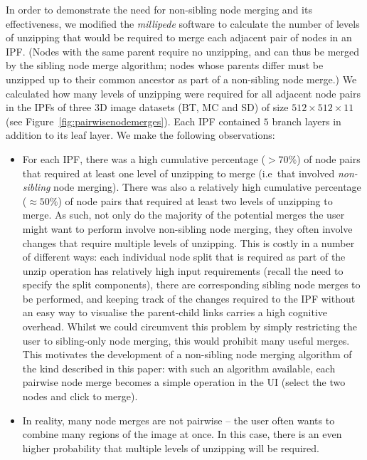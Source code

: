 \documentclass[10pt,twocolumn,twoside]{IEEEtran}
\begin{document}
In order to demonstrate the need for non-sibling node merging and its effectiveness, we modified the \emph{millipede} software to calculate the number of levels of unzipping that would be required to merge each adjacent pair of nodes in an IPF. (Nodes with the same parent require no unzipping, and can thus be merged by the sibling node merge algorithm; nodes whose parents differ must be unzipped up to their common ancestor as part of a non-sibling node merge.) We calculated how many levels of unzipping were required for all adjacent node pairs in the IPFs of three 3D image datasets (BT, MC and SD) of size $512 \times 512 \times 11$ (see Figure~\ref{fig:pairwisenodemerges}). Each IPF contained $5$ branch layers in addition to its leaf layer. We make the following observations:
%
\begin{itemize}
\item For each IPF, there was a high cumulative percentage ($> 70\%$) of node pairs that required at least one level of unzipping to merge (i.e~that involved \emph{non-sibling} node merging). There was also a relatively high cumulative percentage ($\approx 50\%$) of node pairs that required at least two levels of unzipping to merge. As such, not only do the majority of the potential merges the user might want to perform involve non-sibling node merging, they often involve changes that require multiple levels of unzipping. This is costly in a number of different ways: each individual node split that is required as part of the unzip operation has relatively high input requirements (recall the need to specify the split components), there are corresponding sibling node merges to be performed, and keeping track of the changes required to the IPF without an easy way to visualise the parent-child links carries a high cognitive overhead. Whilst we could circumvent this problem by simply restricting the user to sibling-only node merging, this would prohibit many useful merges. This motivates the development of a non-sibling node merging algorithm of the kind described in this paper: with such an algorithm available, each pairwise node merge becomes a simple operation in the UI (select the two nodes and click to merge).

\item In reality, many node merges are not pairwise -- the user often wants to combine many regions of the image at once. In this case, there is an even higher probability that multiple levels of unzipping will be required.
\end{itemize}
%
\end{document}
